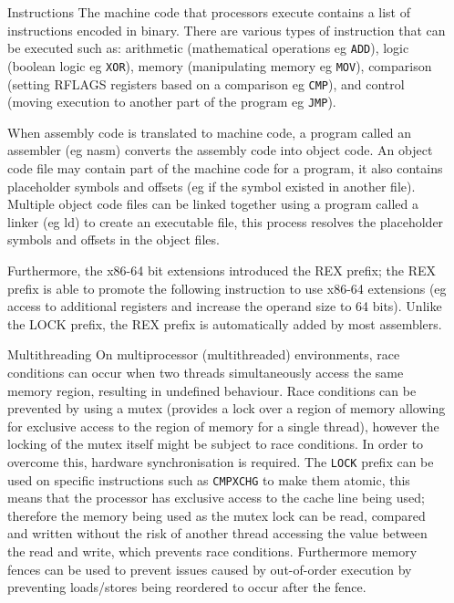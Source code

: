 \documentclass[final]{beamer}
\newlength{\sepwidth}
\newlength{\colwidth}
\newcommand{\separatorcolumn}{\begin{column}{\sepwidth}\end{column}}
\begin{document}
\begin{frame}[t]
\begin{columns}[t]
\begin{column}{\colwidth}
  \begin{block}{Instructions}
    The machine code that processors execute contains a list of instructions encoded in binary.
    There are various types of instruction that can be executed such as: arithmetic (mathematical operations eg \texttt{ADD}), logic (boolean logic eg \texttt{XOR}), memory (manipulating memory eg \texttt{MOV}), comparison (setting RFLAGS registers based on a comparison eg \texttt{CMP}), and control (moving execution to another part of the program eg \texttt{JMP}).

    When assembly code is translated to machine code, a program called an assembler (eg nasm) converts the assembly code into object code.
    An object code file may contain part of the machine code for a program, it also contains placeholder symbols and offsets (eg if the symbol existed in another file).
    Multiple object code files can be linked together using a program called a linker (eg ld) to create an executable file, this process resolves the placeholder symbols and offsets in the object files.

    Furthermore, the x86-64 bit extensions introduced the REX prefix;
    the REX prefix is able to promote the following instruction to use x86-64 extensions (eg access to additional registers and increase the operand size to 64 bits).
    Unlike the LOCK prefix, the REX prefix is automatically added by most assemblers.
  \end{block}

  \begin{block}{Multithreading}
    On multiprocessor (multithreaded) environments, race conditions can occur when two threads simultaneously access the same memory region, resulting in undefined behaviour.
    Race conditions can be prevented by using a mutex (provides a lock over a region of memory allowing for exclusive access to the region of memory for a single thread), however the locking of the mutex itself might be subject to race conditions.
    In order to overcome this, hardware synchronisation is required.
    The \texttt{LOCK} prefix can be used on specific instructions such as \texttt{CMPXCHG} to make them atomic, this means that the processor has exclusive access to the cache line being used;
    therefore the memory being used as the mutex lock can be read, compared and written without the risk of another thread accessing the value between the read and write, which prevents race conditions.
    Furthermore memory fences can be used to prevent issues caused by out-of-order execution by preventing loads/stores being reordered to occur after the fence.
  \end{block}
\end{column}
\separatorcolumn

\end{columns}
\end{frame}
\end{document}
